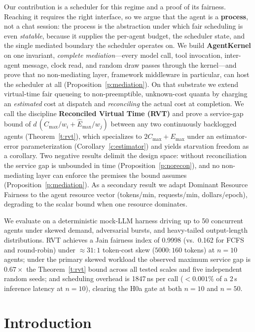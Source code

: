 \documentclass[letterpaper,11pt,leqno]{article}
\begin{document}
\begin{titlepage}
Our contribution is a scheduler for this regime and a proof of its fairness. Reaching it requires the right interface, so we argue that the agent is a \textbf{process}, not a chat session: the process is the abstraction under which fair scheduling is even \emph{statable}, because it supplies the per-agent budget, the scheduler state, and the single mediated boundary the scheduler operates on. We build \textbf{AgentKernel} on one invariant, \emph{complete mediation}---every model call, tool invocation, inter-agent message, clock read, and random draw passes through the kernel---and prove that no non-mediating layer, framework middleware in particular, can host the scheduler at all (Proposition~\ref{p:mediation}). On that substrate we extend virtual-time fair queueing to non-preemptible, unknown-cost quanta by charging an \emph{estimated} cost at dispatch and \emph{reconciling} the actual cost at completion. We call the discipline \textbf{Reconciled Virtual Time (RVT)} and prove a service-gap bound of $d\,(C_{\max}/w_i + \hat{E}_{\max}/w_j)$ between any two continuously backlogged agents (Theorem~\ref{t:rvt}), which specializes to $2C_{\max} + E_{\max}$ under an estimator-error parameterization (Corollary~\ref{c:estimator}) and yields starvation freedom as a corollary. Two negative results delimit the design space: without reconciliation the service gap is unbounded in time (Proposition~\ref{p:norecon}), and no non-mediating layer can enforce the premises the bound assumes (Proposition~\ref{p:mediation}). As a secondary result we adapt Dominant Resource Fairness \citep{Ghodsi11} to the agent resource vector (tokens/min, requests/min, dollars/epoch), degrading to the scalar bound when one resource dominates.

We evaluate on a deterministic mock-LLM harness driving up to 50 concurrent agents under skewed demand, adversarial bursts, and heavy-tailed output-length distributions. RVT achieves a Jain fairness index of 0.9998 (vs.\ 0.162 for FCFS and round-robin) under ${\approx}31\!:\!1$ token-cost skew ($5000\!:\!160$ tokens) at $n=10$ agents; under the primary skewed workload the observed maximum service gap is $0.67\!\times$ the Theorem~\ref{t:rvt} bound across all tested scales and five independent random seeds; and scheduling overhead is 1847\,ns per call ($<0.001\%$ of a 2\,s inference latency at $n=10$), clearing the H0a gate at both $n=10$ and $n=50$.

\end{titlepage}

\section{Introduction}\label{s:introduction}
\end{document}
